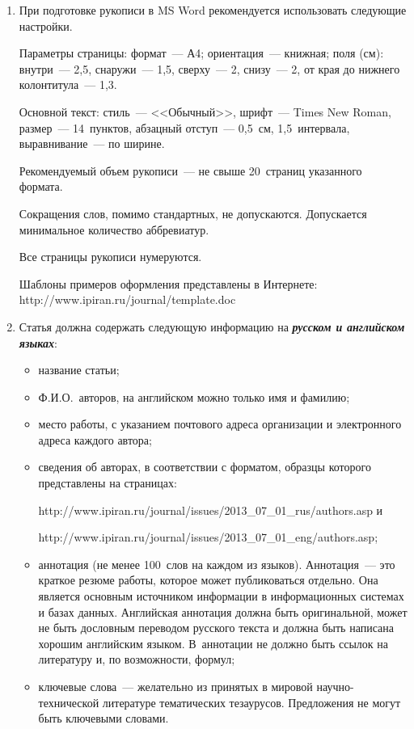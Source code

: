{\begin{enumerate}[1.]
\item При подготовке рукописи в MS Word рекомендуется использовать следующие 
настройки.

Параметры страницы:  
формат~--- А4; ориентация~--- книжная; поля (см): внутри~--- 2,5, снаружи~--- 1,5, 
сверху~--- 2, снизу~--- 2, от края до нижнего колонтитула~--- 1,3.  

Основной текст: стиль~--- <<Обычный>>, шрифт~--- Times New Roman, размер~--- 
14~пунк\-тов, абзацный отступ~--- 0,5~см, 1,5~интервала, выравнивание~--- по ширине.  
 
 
 \thispagestyle{empty}

Рекомендуемый объем рукописи~--- не свыше 20~страниц указанного формата.  

Сокращения слов, помимо стандартных, не допускаются. Допускается минимальное 
количество аббревиатур. 

Все страницы рукописи нумеруются. 

Шаблоны примеров оформления представлены в Интернете: {\sf 
http://www.ipiran.ru/journal/\linebreak template.doc}\\[-13.5pt]  

\item Статья должна содержать следующую информацию на {\bfseries\textit{русском и 
английском языках}}: 
\begin{itemize}
\item название статьи;
\item Ф.И.О.\ авторов, на английском можно только имя и фамилию;\\[-13.5pt] 
\item место работы, с указанием почтового адреса организации и электронного адреса каждого 
автора;\\[-13.5pt]  
\item сведения об авторах, в соответствии с форматом, образцы которого 
представлены на страницах: 

\thispagestyle{empty}

{\sf http://www.ipiran.ru/journal/issues/2013\_07\_01\_rus/authors.asp} и 

{\sf http://www.ipiran.ru/journal/issues/2013\_07\_01\_eng/authors.asp}; 
\item аннотация (не менее 100~слов на каждом из языков). Аннотация~--- это краткое 
резюме работы, которое может публиковаться отдельно. Она является основным 
источником информации в информационных системах и базах данных. Английская 
аннотация должна быть оригинальной, может не быть дословным переводом русского 
текста и должна быть написана хорошим английским языком. В~аннотации не должно 
быть ссылок на литературу и, по возможности, формул;
\item ключевые слова~--- желательно из принятых в мировой 
на\-уч\-но-тех\-ни\-че\-ской литературе тематических тезаурусов. Предложения не 
могут быть ключевыми словами.
\end{itemize}


\end{enumerate}}
